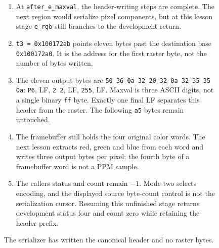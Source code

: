 \begin{figure}[htbp]
\begin{minipage}{\linewidth}
\begin{enumerate}
      \item At \texttt{after\_e\_maxval}, the header-writing steps are complete. The next region would serialize pixel components, but at this lesson stage \texttt{e\_rgb} still branches to the development return.
      \item \texttt{t3 = 0x100172ab} points eleven bytes past the destination base \texttt{0x100172a0}. It is the address for the first raster byte, not the number of bytes written.
      \item The eleven output bytes are \texttt{50 36 0a 32 20 32 0a 32 35 35 0a}: \texttt{P6}, LF, \texttt{2 2}, LF, \texttt{255}, LF. Maxval is three ASCII digits, not a single binary \texttt{ff} byte. Exactly one final LF separates this header from the raster. The following \texttt{a5} bytes remain untouched.
      \item The framebuffer still holds the four original color words. The next lesson extracts red, green and blue from each word and writes three output bytes per pixel; the fourth byte of a framebuffer word is not a PPM sample.
      \item The caller\textquotesingle s status and count remain $-1$. Mode two selects encoding, and the displayed source byte-count control is not the serialization cursor. Resuming this unfinished stage returns development status four and count zero while retaining the header prefix.
    \end{enumerate}
  \end{minipage}
  \caption{The serializer has written the canonical header and no raster bytes.}
  \label{capture:029-binary-ppm-f03}
  \label{ppm-f03}
\end{figure}
\par
